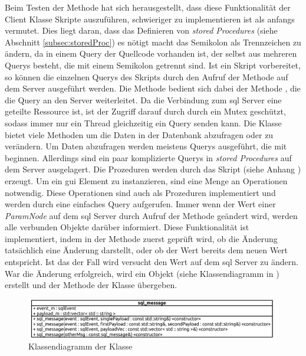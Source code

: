 Beim Testen der Methode hat sich herausgestellt, dass diese Funktionalität der  Client Klasse Skripte auszuführen, schwieriger zu implementieren ist als anfangs vermutet.
Dies liegt daran, dass das Definieren von \emph{stored Procedures} (siehe Abschnitt \ref{subsec:storedProc}) es nötigt macht das Semikolon als Trennzeichen zu ändern, 
da in einem Query der Quellcode vorhanden ist, der selbst aus mehreren Querys besteht, die mit einem Semikolon getrennt sind.
Ist ein Skript vorbereitet, so können die einzelnen Querys des Skripts durch den Aufruf der Methode  auf dem Server ausgeführt werden.
Die Methode  bedient sich dabei der Methode , die die Query an den Server weiterleitet.
Da die Verbindung zum \ac{sql} Server eine geteilte Ressource ist, ist der Zugriff darauf durch  durch ein Mutex geschützt, sodass immer nur ein Thread gleichzeitig ein Query senden kann.
Die Klasse  bietet viele Methoden um die Daten in der Datenbank abzufragen oder zu verändern.
Um Daten abzufragen werden meistens Querys ausgeführt, die mit  beginnen.
Allerdings sind ein paar komplizierte Querys in \emph{stored Procedures} auf dem Server ausgelagert.
Die Prozeduren werden durch das Skript  (siehe Anhang ) erzeugt.
Um ein \ac{gui} Element zu instanzieren, sind eine Menge an Operationen notwendig.
Diese Operationen sind auch als Prozeduren implementiert und werden durch eine einfaches  Query aufgerufen.
Immer wenn der Wert einer \emph{ParamNode} auf dem \ac{sql} Server durch Aufruf der Methode  geändert wird, werden alle verbunden  Objekte darüber informiert.
Diese Funktionalität ist implementiert, indem in der  Methode zuerst geprüft wird, ob die Änderung tatsächlich eine Änderung darstellt, oder ob der Wert bereits dem neuen Wert entspricht.
Ist das der Fall wird versucht den Wert auf dem \ac{sql} Server zu ändern. War die Änderung erfolgreich, wird ein  Objekt (siehe Klassendiagramm in ) erstellt 
und der Methode  der Klasse  übergeben. 
\begin{figure}[ht]
  \centering
  \includegraphics[width=\textwidth]{content/hauptteil/umsetzungPoC/backend/uml/classesOfOverview/sql_message.pdf}
  \caption{Klassendiagramm der Klasse }
  \label{fig:backend:classDiag:sqlMsg}
\end{figure}
